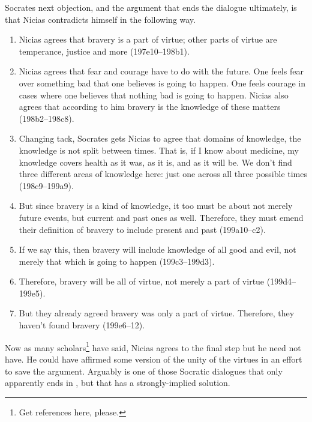 \documentclass[11pt]{article}
\begin{document}
Socrates next objection, and the argument that ends the dialogue ultimately, is that Nicias contradicts himself in the following way.

\begin{enumerate}
    \item Nicias agrees that bravery is a part of virtue; other parts of virtue are temperance, justice and more (197e10--198b1).
    \item Nicias agrees that fear and courage have to do with the future.  One feels fear over something bad that one believes is going to happen.  One feels courage in cases where one believes that nothing bad is going to happen.  Nicias also agrees that according to him bravery is the knowledge of these matters (198b2--198c8).
    \item Changing tack, Socrates gets Nicias to agree that domains of knowledge, the knowledge is not split between times.  That is, if I know about medicine, my knowledge covers health as it was, as it is, and as it will be.  We don't find three different areas of knowledge here: just one across all three possible times (198c9--199a9).
    \item But since bravery is a kind of knowledge, it too must be about not merely future events, but current and past ones as well. Therefore, they must emend their definition of bravery to include present and past (199a10--c2).
    \item If we say this, then bravery will include knowledge of all good and evil, not merely that which is going to happen (199c3--199d3).
    \item Therefore, bravery will be all of virtue, not merely a part of virtue (199d4--199e5).
    \item But they already agreed bravery was only a part of virtue.  Therefore, they haven't found bravery (199e6--12).
\end{enumerate}

Now as many scholars\footnote{Get references here, please.} have said, Nicias agrees to the final step but he need not have.  He could have affirmed some version of the unity of the virtues in an effort to save the argument.  Arguably  is one of those Socratic dialogues that only apparently ends in , but that has a strongly-implied solution.




\end{document}
